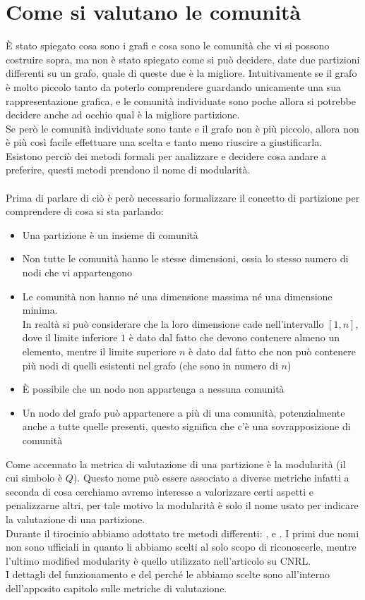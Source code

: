 \section{Come si valutano le comunità}
È stato spiegato cosa sono i grafi e cosa sono le comunità che vi si possono costruire sopra, ma non è stato spiegato come si può decidere, date due partizioni differenti su un grafo, quale di queste due è la migliore. Intuitivamente se il grafo è molto piccolo tanto da poterlo comprendere guardando unicamente una sua rappresentazione grafica, e le comunità individuate sono poche allora si potrebbe decidere anche ad occhio qual è la migliore partizione.\\
Se però le comunità individuate sono tante e il grafo non è più piccolo, allora non è più così facile effettuare una scelta e tanto meno riuscire a giustificarla. Esistono perciò dei metodi formali per analizzare e decidere cosa andare a preferire, questi metodi prendono il nome di modularità.\\
\\
Prima di parlare di ciò è però necessario formalizzare il concetto di partizione per comprendere di cosa si sta parlando:
\begin{itemize}
	\item Una partizione è un insieme di comunità
	\item Non tutte le comunità hanno le stesse dimensioni, ossia lo stesso numero di nodi che vi appartengono
	\item Le comunità non hanno né una dimensione massima né una dimensione minima.\\
	In realtà si può considerare che la loro dimensione cade nell'intervallo $[1, n]$, dove il limite inferiore $1$ è dato dal fatto che devono contenere almeno un elemento, mentre il limite superiore $n$ è dato dal fatto che non può contenere più nodi di quelli esistenti nel grafo (che sono in numero di $n$)
	\item È possibile che un nodo non appartenga a nessuna comunità
	\item Un nodo del grafo può appartenere a più di una comunità, potenzialmente anche a tutte quelle presenti, questo significa che c'è una sovrapposizione di comunità
\end{itemize}
Come accennato la metrica di valutazione di una partizione è la modularità (il cui simbolo è $Q$). Questo nome può essere associato a diverse metriche infatti a seconda di cosa cerchiamo avremo interesse a valorizzare certi aspetti e penalizzarne altri, per tale motivo la modularità è solo il nome usato per indicare la valutazione di una partizione.\\
Durante il tirocinio abbiamo adottato tre metodi differenti: \mmax, \mover e \mmod. I primi due nomi non sono ufficiali in quanto li abbiamo scelti al solo scopo di riconoscerle, mentre l'ultimo modified modularity  è quello utilizzato nell'articolo su CNRL.\\
I dettagli del funzionamento e del perché le abbiamo scelte sono all'interno dell'apposito capitolo sulle metriche di valutazione.
%
